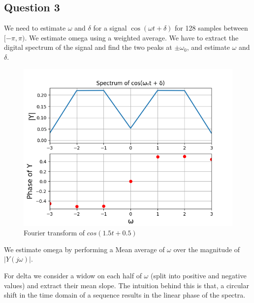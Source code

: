 \documentclass{article}
\begin{document}
\subsection{Question 3}
We need to estimate $\omega$ and $\delta$ for a signal $\cos(\omega t + \delta)$ for 128 samples between $[-\pi,\pi)$. We estimate omega using a weighted average. We have to extract the digital spectrum of the signal and find the two peaks at $\pm\omega_0$, and estimate $\omega$ and $\delta$.
\begin{figure}[h!]
\centering
\includegraphics[scale=0.6]{q3.png}
\caption{Fourier transform of $cos(1.5t+0.5)$}
\label{fig:universe}
\end{figure}

We estimate omega by performing a Mean average of $\omega$ over the magnitude of $|Y(j\omega)|$.

For delta we consider a widow on each half of $\omega$ (split into positive and negative values) and extract their mean slope. The intuition behind this is that, a circular shift in the time domain of a sequence results in the linear phase of the spectra.
\end{document}
